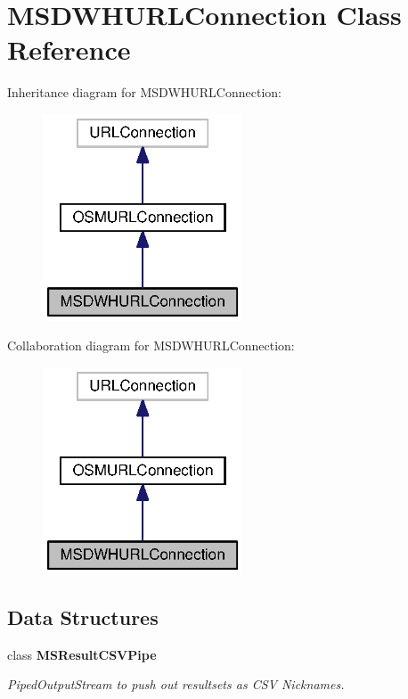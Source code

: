 \section{M\+S\+D\+W\+H\+U\+R\+L\+Connection Class Reference}
\label{classorg_1_1smallfoot_1_1parser_1_1msosmsql_1_1MSDWHURLConnection}


Inheritance diagram for M\+S\+D\+W\+H\+U\+R\+L\+Connection\+:\nopagebreak
\begin{figure}[H]
\begin{center}
\leavevmode
\includegraphics[width=168pt]{classorg_1_1smallfoot_1_1parser_1_1msosmsql_1_1MSDWHURLConnection__inherit__graph}
\end{center}
\end{figure}


Collaboration diagram for M\+S\+D\+W\+H\+U\+R\+L\+Connection\+:\nopagebreak
\begin{figure}[H]
\begin{center}
\leavevmode
\includegraphics[width=168pt]{classorg_1_1smallfoot_1_1parser_1_1msosmsql_1_1MSDWHURLConnection__coll__graph}
\end{center}
\end{figure}
\subsection*{Data Structures}
\begin{DoxyCompactItemize}
\item 
class {\bf M\+S\+Result\+C\+S\+V\+Pipe}
\begin{DoxyCompactList}\small\item\em Piped\+Output\+Stream to push out resultsets as C\+S\+V Nicknames. \end{DoxyCompactList}\end{DoxyCompactItemize}
